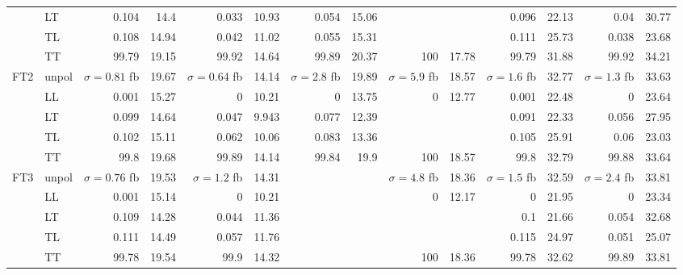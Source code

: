 \begin{table}[h]
{\begin{tabular}{llrrrrrrrrrrrr}
 & LT & \num{0.104} & \num{14.4} & \num{0.033} & \num{10.93} & \num{0.054} & \num{15.06} &  &  & \num{0.096} & \num{22.13} & \num{0.04} & \num{30.77} \\
 & TL & \num{0.108} & \num{14.94} & \num{0.042} & \num{11.02} & \num{0.055} & \num{15.31} &  &  & \num{0.111} & \num{25.73} & \num{0.038} & \num{23.68} \\
 & TT & \num{99.79} & \num{19.15} & \num{99.92} & \num{14.64} & \num{99.89} & \num{20.37} & \num{100} & \num{17.78} & \num{99.79} & \num{31.88} & \num{99.92} & \num{34.21} \\
\midrule
\multirow{5}{*}{FT2}
 & unpol & $\sigma = \num{0.81}$ fb & \num{19.67} & $\sigma = \num{0.64}$ fb & \num{14.14} & $\sigma = \num{2.8}$ fb & \num{19.89} & $\sigma = \num{5.9}$ fb & \num{18.57} & $\sigma = \num{1.6}$ fb & \num{32.77} & $\sigma = \num{1.3}$ fb & \num{33.63} \\
 & LL & \num{0.001} & \num{15.27} & \num{0} & \num{10.21} & \num{0} & \num{13.75} & \num{0} & \num{12.77} & \num{0.001} & \num{22.48} & \num{0} & \num{23.64} \\
 & LT & \num{0.099} & \num{14.64} & \num{0.047} & \num{9.943} & \num{0.077} & \num{12.39} &  &  & \num{0.091} & \num{22.33} & \num{0.056} & \num{27.95} \\
 & TL & \num{0.102} & \num{15.11} & \num{0.062} & \num{10.06} & \num{0.083} & \num{13.36} &  &  & \num{0.105} & \num{25.91} & \num{0.06} & \num{23.03} \\
 & TT & \num{99.8} & \num{19.68} & \num{99.89} & \num{14.14} & \num{99.84} & \num{19.9} & \num{100} & \num{18.57} & \num{99.8} & \num{32.79} & \num{99.88} & \num{33.64} \\
\midrule
\multirow{5}{*}{FT3}
 & unpol & $\sigma = \num{0.76}$ fb & \num{19.53} & $\sigma = \num{1.2}$ fb & \num{14.31} &  &  & $\sigma = \num{4.8}$ fb & \num{18.36} & $\sigma = \num{1.5}$ fb & \num{32.59} & $\sigma = \num{2.4}$ fb & \num{33.81} \\
 & LL & \num{0.001} & \num{15.14} & \num{0} & \num{10.21} &  &  & \num{0} & \num{12.17} & \num{0} & \num{21.95} & \num{0} & \num{23.34} \\
 & LT & \num{0.109} & \num{14.28} & \num{0.044} & \num{11.36} &  &  &  &  & \num{0.1} & \num{21.66} & \num{0.054} & \num{32.68} \\
 & TL & \num{0.111} & \num{14.49} & \num{0.057} & \num{11.76} &  &  &  &  & \num{0.115} & \num{24.97} & \num{0.051} & \num{25.07} \\
 & TT & \num{99.78} & \num{19.54} & \num{99.9} & \num{14.32} &  &  & \num{100} & \num{18.36} & \num{99.78} & \num{32.62} & \num{99.89} & \num{33.81} \\

\end{tabular}}
\end{table}
